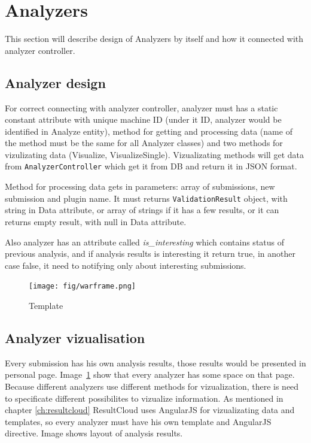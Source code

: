 \section{Analyzers}

This section will describe design of Analyzers by itself and how it connected with analyzer controller.

\subsection{Analyzer design}

For correct connecting with analyzer controller, analyzer must has a static constant attribute with unique machine ID (under it ID, analyzer would be identified in Analyze entity), method for getting and processing data (name of the method must be the same for all Analyzer classes) and two methods for vizulizating data (Visualize, VisualizeSingle). Vizualizating methods will get data from \texttt{AnalyzerController} which get it from DB and return it in JSON format.

Method for processing data gets in parameters: array of submissions, new submission and plugin name. It must returns \texttt{ValidationResult} object, with string in Data attribute, or array of strings if it has a few results, or it can returns empty result, with null in Data attribute.

Also analyzer has an attribute called \emph{is\_interesting} which contains status of previous analysis, and if analysis results is interesting it return true, in another case false, it need to notifying only about interesting submissions.

\begin{figure}
  \centering
    \texttt{[image: fig/warframe.png]}
  \caption{Template}
  \label{fig:temp}
\end{figure}

\subsection{Analyzer vizualisation}

Every submission has his own analysis results, those results would be presented in personal page. Image\ \ref{fig:temp} show that every analyzer has some space on that page. Because different analyzers use different methods for vizualization, there is need to specificate different possibilites to vizualize information. As mentioned in chapter \ref{ch:resultcloud} ResultCloud uses AngularJS for vizualizating data and templates, so every analyzer must have his own template and AngularJS  directive. Image shows layout of analysis results.

